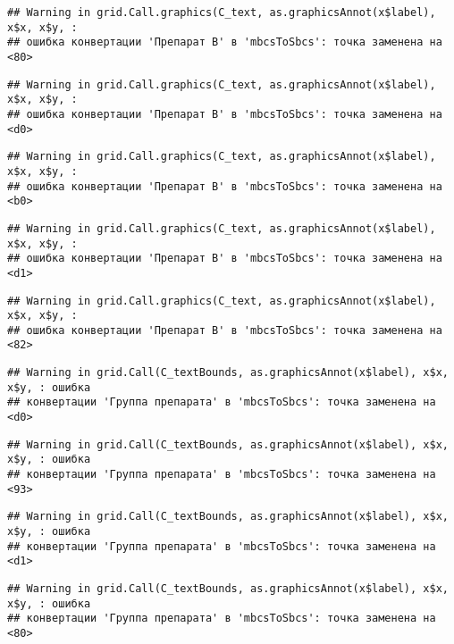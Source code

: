 \documentclass[
]{article}
\begin{document}
\begin{verbatim}
## Warning in grid.Call.graphics(C_text, as.graphicsAnnot(x$label), x$x, x$y, :
## ошибка конвертации 'Препарат B' в 'mbcsToSbcs': точка заменена на <80>
\end{verbatim}

\begin{verbatim}
## Warning in grid.Call.graphics(C_text, as.graphicsAnnot(x$label), x$x, x$y, :
## ошибка конвертации 'Препарат B' в 'mbcsToSbcs': точка заменена на <d0>
\end{verbatim}

\begin{verbatim}
## Warning in grid.Call.graphics(C_text, as.graphicsAnnot(x$label), x$x, x$y, :
## ошибка конвертации 'Препарат B' в 'mbcsToSbcs': точка заменена на <b0>
\end{verbatim}

\begin{verbatim}
## Warning in grid.Call.graphics(C_text, as.graphicsAnnot(x$label), x$x, x$y, :
## ошибка конвертации 'Препарат B' в 'mbcsToSbcs': точка заменена на <d1>
\end{verbatim}

\begin{verbatim}
## Warning in grid.Call.graphics(C_text, as.graphicsAnnot(x$label), x$x, x$y, :
## ошибка конвертации 'Препарат B' в 'mbcsToSbcs': точка заменена на <82>
\end{verbatim}

\begin{verbatim}
## Warning in grid.Call(C_textBounds, as.graphicsAnnot(x$label), x$x, x$y, : ошибка
## конвертации 'Группа препарата' в 'mbcsToSbcs': точка заменена на <d0>
\end{verbatim}

\begin{verbatim}
## Warning in grid.Call(C_textBounds, as.graphicsAnnot(x$label), x$x, x$y, : ошибка
## конвертации 'Группа препарата' в 'mbcsToSbcs': точка заменена на <93>
\end{verbatim}

\begin{verbatim}
## Warning in grid.Call(C_textBounds, as.graphicsAnnot(x$label), x$x, x$y, : ошибка
## конвертации 'Группа препарата' в 'mbcsToSbcs': точка заменена на <d1>
\end{verbatim}

\begin{verbatim}
## Warning in grid.Call(C_textBounds, as.graphicsAnnot(x$label), x$x, x$y, : ошибка
## конвертации 'Группа препарата' в 'mbcsToSbcs': точка заменена на <80>
\end{verbatim}
\end{document}
